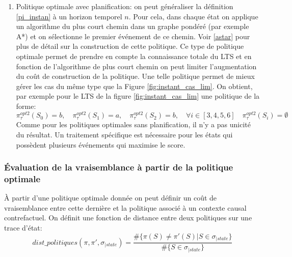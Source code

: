 \documentclass[11pt]{extarticle}
\begin{document}
\begin{enumerate}
    De cet exemple on tire deux observations. La politique optimale sans planification ne tire pas partie de la connaissance totale du LTS et des scores associés aux événements. Deuxièmement on note que la politique optimale n'est pas unique. En effet, un choix arbitraire a été effectué en $S_1$ pour le choix de l'événement $a$. Dans les cas où plusieurs événements maximisent le score on peut appliquer une seconde heuristique ou choisir aléatoirement.
     
     \item Politique optimale avec planification: on peut généraliser la définition \ref{pi_instan} à un horizon temporel $n$. Pour cela, dans chaque état on applique un algorithme du plus court chemin dans un graphe pondéré (par exemple A*) et on sélectionne le premier événement de ce chemin. Voir \ref{astar} pour plus de détail sur la construction de cette politique. Ce type de politique optimale permet de prendre en compte la connaissance totale du LTS et en fonction de l'algorithme de plus court chemin on peut limiter l'augmentation du coût de construction de la politique. Une telle politique permet de mieux gérer les cas du même type que la Figure \ref{fig:instant_cas_lim}. On obtient, par exemple pour le LTS de la figure \ref{fig:instant_cas_lim} une politique de la forme:
     \begin{equation}
         \pi_\tau^{opt2}(S_0)=b,\quad \pi_\tau^{opt2}(S_1)=a,\quad \pi_\tau^{opt2}(S_2)=b,\quad \forall i\in[3,4,5,6]\quad  \pi^{opt2}_\tau(S_i)=\emptyset
     \end{equation}
     Comme pour les politiques optimales sans planification, il n'y a pas unicité du résultat. Un traitement spécifique est nécessaire pour les états qui possèdent plusieurs événements qui maximise le score.
 \end{enumerate}

\subsubsection{Évaluation de la vraisemblance à partir de la politique optimale}

À partir d'une politique optimale donnée on peut définir un coût de vraisemblance entre cette dernière et la politique associé à un contexte causal contrefactuel. On définit une fonction de distance entre deux politiques sur une trace d'état: 
\begin{equation}
dist\_politiques(\pi,\pi',\sigma_{|state}) =\frac{ \#\{\pi(S) \neq \pi'(S)| S\in \sigma_{|state}\}}{\#\{S\in \sigma_{|state}\}}    
\end{equation}
\end{document}
